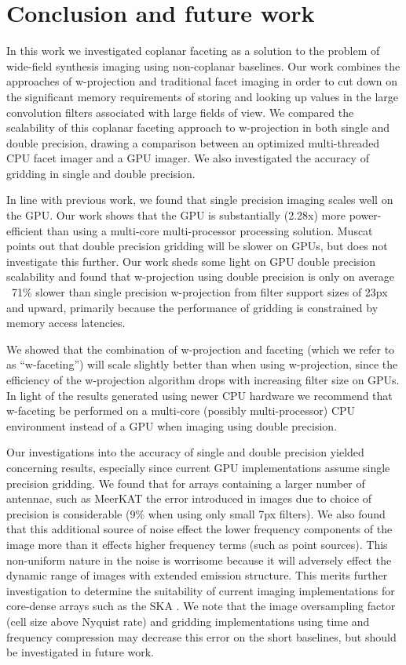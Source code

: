 \chapter{Conclusion and future work}
In this work we investigated coplanar faceting as a solution to the problem of wide-field synthesis imaging using non-coplanar baselines.
Our work combines the approaches of w-projection and traditional facet imaging in order to cut down on the significant memory requirements of 
storing and looking up values in the large convolution filters associated with large fields of view. We compared the scalability of this coplanar
faceting approach to w-projection in both single and double precision, drawing a comparison between an optimized multi-threaded CPU facet imager and a 
GPU imager. We also investigated the accuracy of gridding in single and double precision.

In line with previous work, we found that single precision imaging scales well on the GPU. Our work shows that the GPU is substantially (2.28x) more 
power-efficient than using a multi-core multi-processor processing solution. Muscat \cite{muscat2014high} points out that double precision 
gridding will be slower on GPUs, but does not investigate this further. Our work sheds some light on GPU double precision scalability and found that w-projection
using double precision is only on average ~71\% slower than single precision w-projection from filter support sizes of 23px and upward, primarily because 
the performance of gridding is constrained by memory access latencies. 

We showed that the combination of w-projection and faceting (which we refer to as ``w-faceting'') will scale slightly better than when using w-projection, 
since the efficiency of the w-projection algorithm drops with increasing filter size on GPUs. In light of the results generated using newer CPU hardware we recommend that w-faceting be
performed on a multi-core (possibly multi-processor) CPU environment instead of a GPU when imaging using double precision.

Our investigations into the accuracy of single and double precision yielded concerning results, especially since current GPU implementations assume single precision gridding. We found
that for arrays containing a larger number of antennae, such as MeerKAT the error introduced in images due to choice of precision is considerable (9\% when using only small 7px filters). 
We also found that this additional source of noise effect the lower frequency components of the image more than it effects higher frequency terms (such as point sources). This 
non-uniform nature in the noise is worrisome because it will adversely effect the dynamic range of images with extended emission structure. This merits further investigation
to determine the suitability of current imaging implementations for core-dense arrays such as the SKA \cite{skaconfig}. We note that the image oversampling factor 
(cell size above Nyquist rate) and gridding implementations using time and frequency compression may decrease this error on the short baselines, but should be investigated 
in future work.

